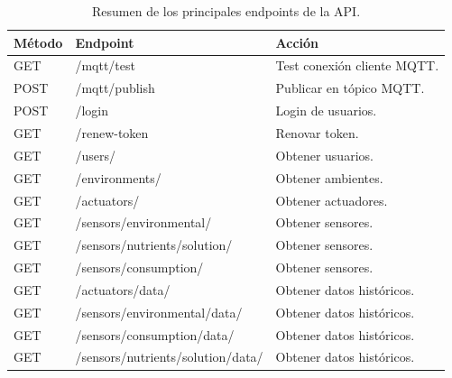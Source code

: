 \begin{table}[H]
    \centering
    \caption[Resumen de los principales endpoints de la API]{Resumen de los principales endpoints de la API.}
    \begin{tabular}{l l l}
        \toprule
        \textbf{Método} & \textbf{Endpoint}                 & \textbf{Acción}             \\
        \midrule
        GET             & /mqtt/test                        & Test conexión cliente MQTT. \\
        POST            & /mqtt/publish                     & Publicar en tópico MQTT.    \\
        \midrule
        POST            & /login                            & Login de usuarios.          \\
        GET             & /renew-token                      & Renovar token.              \\
        \midrule
        GET             & /users/                           & Obtener usuarios.           \\
        \midrule
        GET             & /environments/                    & Obtener ambientes.          \\
        \midrule
        GET             & /actuators/                       & Obtener actuadores.         \\
        \midrule
        GET             & /sensors/environmental/           & Obtener sensores.           \\
        \midrule
        GET             & /sensors/nutrients/solution/      & Obtener sensores.           \\
        \midrule
        GET             & /sensors/consumption/             & Obtener sensores.           \\
        \midrule
        GET             & /actuators/data/                  & Obtener datos históricos.   \\
        GET             & /sensors/environmental/data/      & Obtener datos históricos.   \\
        GET             & /sensors/consumption/data/        & Obtener datos históricos.   \\
        GET             & /sensors/nutrients/solution/data/ & Obtener datos históricos.   \\
        \bottomrule
        \hline
    \end{tabular}
    \label{tab:endpoints}
\end{table}


